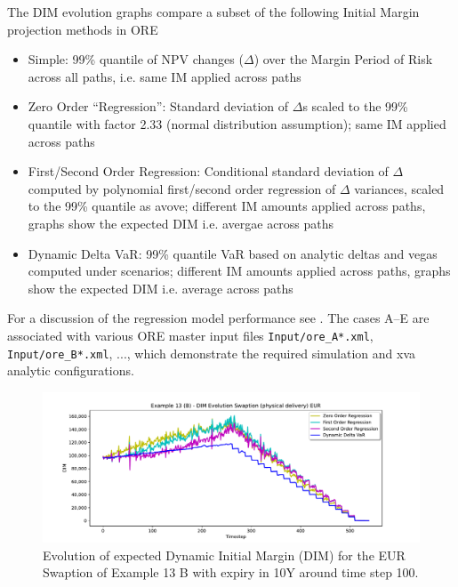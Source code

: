 The DIM evolution graphs compare a subset of the following Initial Margin projection methods in ORE
\begin{itemize}
\item Simple: 99\% quantile of NPV changes ($\Delta$) over the Margin Period of Risk across all paths, i.e. same IM applied across paths
\item Zero Order ``Regression'': Standard deviation of $\Delta$s scaled to the 99\% quantile with factor 2.33 (normal distribution assumption); same IM applied across paths
\item First/Second Order Regression: Conditional standard deviation of $\Delta$ computed by polynomial first/second order regression of $\Delta$ variances, scaled to the 99\% quantile as avove; different IM amounts applied across paths, graphs show the expected DIM i.e. avergae across paths
\item Dynamic Delta VaR: 99\% quantile VaR based on analytic deltas and vegas computed under scenarios; different IM amounts applied across paths, graphs show the expected DIM i.e. average across paths
\end{itemize}

For a discussion of the regression model performance see \cite{Anfuso2016,LichtersEtAl}. The cases A--E are associated with
various ORE master input files {\tt Input/ore\_A*.xml},  {\tt Input/ore\_B*.xml}, ..., which demonstrate the required simulation
and xva analytic configurations.
 
\begin{figure}[h!]
\begin{center}
\includegraphics[scale=0.45]{examples/mpl_dim_evolution_B_swaption_eur.pdf}
\end{center}
\caption{Evolution of expected Dynamic Initial Margin (DIM) for the EUR Swaption of Example 13 B with expiry in 10Y
  around time step 100.}
\label{fig_ex13b_evolution}
\end{figure}

